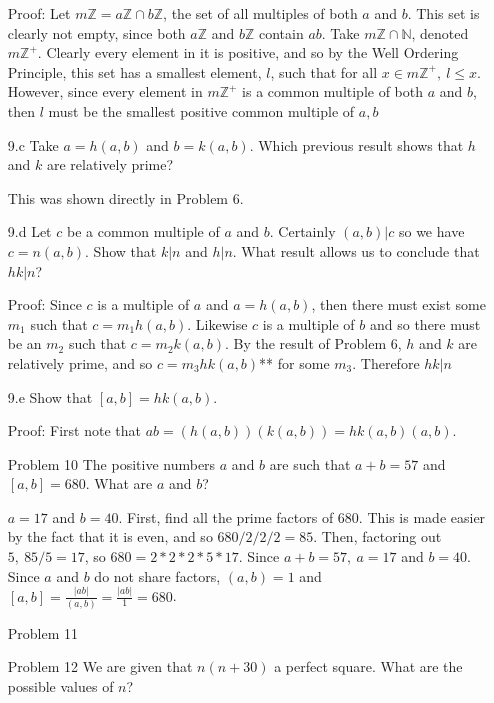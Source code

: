 \documentclass[letterpaper]{article}
\newcommand{\Integers}{\mathbb{Z}}
\newcommand{\Naturals}{\mathbb{N}}
\begin{document}
\begin{itemize}
          Proof: Let \(m\Integers = a\Integers \cap b\Integers\), the set of all multiples of both \(a\) and \(b\). This set is clearly not empty, since both \(a\Integers\) and \(b\Integers\) contain \(ab\). Take \(m\Integers \cap \Naturals\), denoted \(m\Integers^+\). Clearly every element in it is positive, and so by the Well Ordering Principle, this set has a smallest element, \(l\), such that for all \(x \in m\Integers^+,\ l \leq x\). However, since every element in \(m\Integers^+\) is a common multiple of both \(a\) and \(b\), then \(l\) must be the smallest positive common multiple of \(a, b\)

    \item[9.c] Take \(a = h(a, b)\) and \(b = k(a, b)\). Which previous result shows that \(h\) and \(k\) are relatively prime?

          This was shown directly in Problem 6.

    \item[9.d] Let \(c\) be a common multiple of \(a\) and \(b\). Certainly \((a, b)|c\) so we have \(c = n(a, b)\). Show that \(k | n\) and \(h | n\). What result allows us to conclude that \(hk | n\)?

          Proof: Since \(c\) is a multiple of \(a\) and \(a = h(a,b)\), then there must exist some \(m_1\) such that \(c = m_1h(a,b)\). Likewise \(c\) is a multiple of \(b\) and so there must be an \(m_2\) such that \(c = m_2k(a,b)\). By the result of Problem 6, \(h\) and \(k\) are relatively prime, and so \(c = m_3hk(a,b)\)** for some \(m_3\). Therefore \(hk | n\)

    \item[9.e] Show that \([a, b] = hk(a, b)\).

          Proof: First note that \(ab = (h(a,b))(k(a,b)) = hk(a,b)(a,b)\).


    \item[Problem 10] The positive numbers \(a\) and \(b\) are such that \(a + b = 57\) and \([a, b] = 680\). What are \(a\) and \(b\)?

          \(a = 17\) and \(b = 40\). First, find all the prime factors of 680. This is made easier by the fact that it is even, and so \(680 / 2 /2 / 2 = 85\). Then, factoring out  \(5,\ 85 / 5 = 17\), so \(680 = 2*2*2*5*17\). Since \(a + b = 57,\ a = 17\) and \(b = 40\). Since \(a\) and \(b\) do not share factors, \((a,b) = 1\) and \([a, b] = \frac{|ab|}{(a,b)} = \frac{|ab|}{1} = 680\).

    \item[Problem 11]
    \item[Problem 12] We are given that \(n(n + 30)\) a perfect square. What are the possible values of \(n\)?

\end{itemize}
\end{document}
